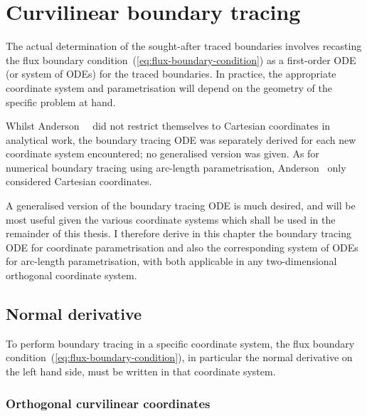 \chapter{Curvilinear boundary tracing}
\label{ch:curvilinear}

The actual determination of the sought-after traced boundaries involves
recasting the flux boundary condition~(\ref{eq:flux-boundary-condition})
as a first-order ODE (or system of ODEs) for the traced boundaries.
In practice, the appropriate coordinate system and parametrisation
will depend on the geometry of the specific problem at hand.

Whilst Anderson~\etal~\cite{
  anderson-2007-boundary-tracing-i-theory,
  anderson-2007-boundary-tracing-ii-applications
}
did not restrict themselves to Cartesian coordinates in analytical work,
the boundary tracing ODE was separately derived
for each new coordinate system encountered;
no generalised version was given.
As for numerical boundary tracing using arc-length parametrisation,
Anderson~\cite{anderson-2002-thesis-boundary-tracing-pdes}
only considered Cartesian coordinates.

A generalised version of the boundary tracing ODE is much desired,
and will be most useful given the various coordinate systems
which shall be used in the remainder of this thesis.
I therefore derive in this chapter
the boundary tracing ODE for coordinate parametrisation
and also the corresponding system of ODEs for arc-length parametrisation,
with both applicable in any two-dimensional orthogonal coordinate system.

\section{Normal derivative}
\label{sec:curvilinear.derivative}

To perform boundary tracing in a specific coordinate system,
the flux boundary condition~(\ref{eq:flux-boundary-condition}),
in particular the normal derivative on the left hand side,
must be written in that coordinate system.

\subsection{Orthogonal curvilinear coordinates}
\label{sec:curvilinear.derivative.orthogonal}

\begin{figure}
\end{figure}

